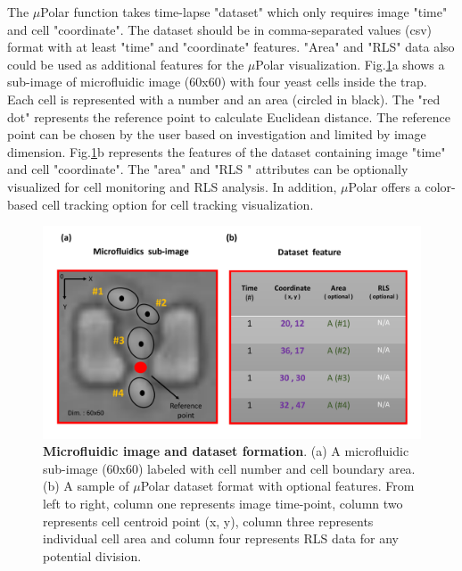 \documentclass[conference]{IEEEtran}
\begin{document}
 
 
 The $\mu$Polar function takes time-lapse "dataset" which only requires image "time" and cell "coordinate". The dataset should be in comma-separated values (csv) format with at least "time" and "coordinate" features. "Area" and "RLS" data also could be used as additional features for the $\mu$Polar visualization. Fig.\ref{fig:table}a shows a sub-image of microfluidic image (60x60) with four yeast cells inside the trap. Each cell is represented with a number and an area (circled in black). The "red dot" represents the reference point to calculate Euclidean distance. The reference point can be chosen by the user based on investigation and limited by image dimension. Fig.\ref{fig:table}b represents the features of the dataset containing image "time" and cell "coordinate".  The "area" and "RLS " attributes can be optionally visualized for cell monitoring and RLS analysis. In addition, $\mu$Polar offers a color-based cell tracking option for cell tracking visualization. 


 
 
\begin{figure}
\centering
\includegraphics[width=\textwidth,height=10 cm]{Patterns/image_ref.pdf}
\caption{ \textbf{ Microfluidic image and dataset formation}. (a) A  microfluidic sub-image (60x60) labeled with cell number and cell boundary area. (b) A sample of $\mu$Polar dataset format with optional features. From left to right, column one represents image time-point, column two represents cell centroid point (x, y), column three represents individual cell area and column four represents RLS data for any potential division.}
\label{fig:table}
\end{figure}
\end{document}
